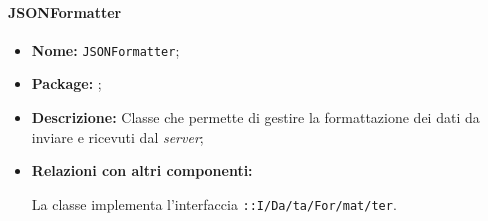 \paragraph{JSONFormatter}
\begin{flushleft}
\begin{itemize}
\item \textbf{Nome:} \texttt{JSONFormatter};
\item \textbf{Package:} \texttt{\serverCommunication{}};
\item \textbf{Descrizione:} Classe che permette di gestire la formattazione dei dati da inviare e ricevuti dal \textit{server};
\item \textbf{Relazioni con altri componenti:}
\begin{sloppypar}
La classe implementa l'interfaccia \texttt{\iServerCommunication{}::I\fshyp{}Da\fshyp{}ta\fshyp{}For\fshyp{}mat\fshyp{}ter}.
\end{sloppypar}
\end{itemize}
\end{flushleft}
